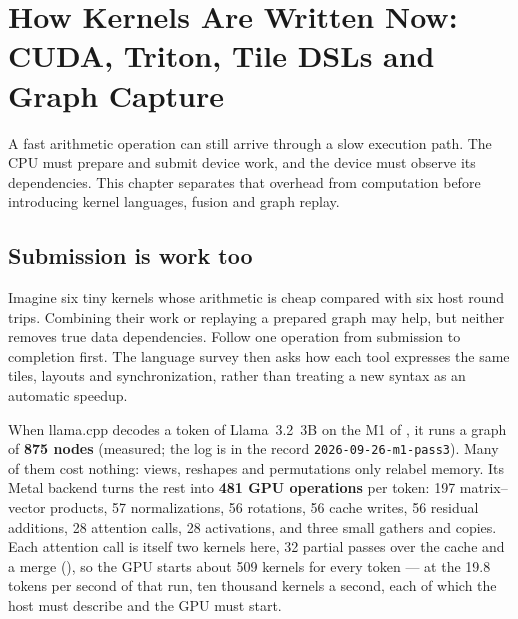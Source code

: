 \chapter{How Kernels Are Written Now: CUDA, Triton, Tile DSLs and Graph Capture}\label{ch:kernel-languages}

\begin{ChapterIntent}
A fast arithmetic operation can still arrive through a slow execution path. The CPU must
prepare and submit device work, and the device must observe its dependencies. This
chapter separates that overhead from computation before introducing kernel languages,
fusion and graph replay.
\end{ChapterIntent}

\section*{Submission is work too}
Imagine six tiny kernels whose arithmetic is cheap compared with six host round trips.
Combining their work or replaying a prepared graph may help, but neither removes true
data dependencies. Follow one operation from submission to completion first. The
language survey then asks how each tool expresses the same tiles, layouts and
synchronization, rather than treating a new syntax as an automatic speedup.


When llama.cpp decodes a token of Llama~3.2~3B on the M1 of ,
it runs a graph of \textbf{875 nodes} (measured; the log is in the record
\texttt{2026-09-26-m1-pass3}). Many of them cost nothing: views, reshapes and
permutations only relabel memory. Its Metal backend turns the rest into
\textbf{481 GPU operations} per token: 197 matrix--vector products, 57
normalizations, 56 rotations, 56 cache writes, 56 residual additions, 28
attention calls, 28 activations, and three small gathers and copies. Each
attention call is itself two kernels here, 32 partial passes over the cache
and a merge (), so the GPU starts about 509 kernels for
every token --- at the 19.8 tokens per second of that run, ten thousand
kernels a second, each of which the host must describe and the GPU must start.

